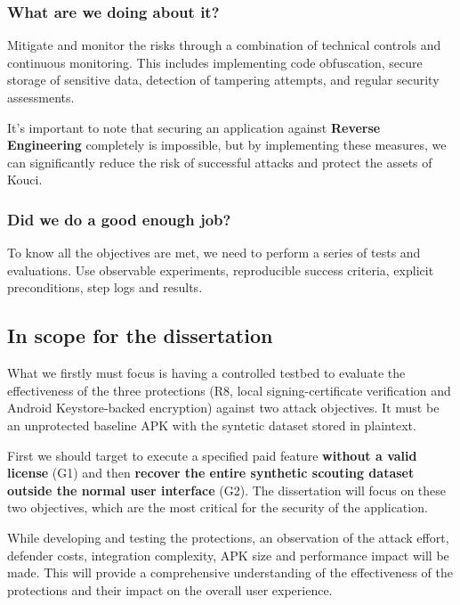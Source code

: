 \documentclass{article}
\begin{document}
\subsubsection{What are we doing about it?}

Mitigate and monitor the risks through a combination of technical controls and continuous monitoring. This includes implementing code obfuscation, secure storage of sensitive data, detection of tampering attempts, and regular security assessments.

It's important to note that securing an application against \textbf{Reverse Engineering} completely is impossible, but by implementing these measures, we can significantly reduce the risk of successful attacks and protect the assets of Kouci.

\subsubsection{Did we do a good enough job?}

To know all the objectives are met, we need to perform a series of tests and evaluations. Use observable experiments, reproducible success criteria, explicit preconditions, step logs and results.

\subsection{In scope for the dissertation}

What we firstly must focus is having a controlled testbed to evaluate the effectiveness of the three protections (R8, local signing-certificate verification and Android Keystore-backed encryption) against two attack objectives. It must be an unprotected baseline APK with the syntetic dataset stored in plaintext. 

First we should target to execute a specified paid feature \textbf{without a valid license} (G1) and then \textbf{recover the entire synthetic scouting dataset outside the normal user interface} (G2). The dissertation will focus on these two objectives, which are the most critical for the security of the application.

While developing and testing the protections, an observation of the attack effort, defender costs, integration complexity, APK size and performance impact will be made. This will provide a comprehensive understanding of the effectiveness of the protections and their impact on the overall user experience.
\end{document}
